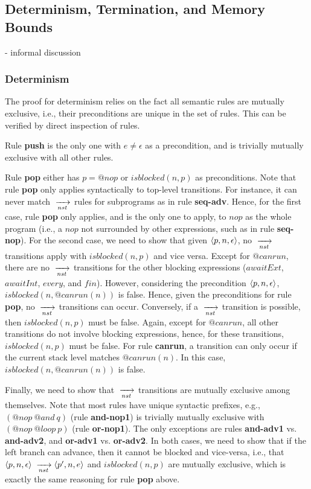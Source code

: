 \subsection{Determinism, Termination, and Memory Bounds}

- informal discussion

\subsubsection*{Determinism}

The proof for determinism relies on the fact all semantic rules are mutually
exclusive, i.e., their preconditions are unique in the set of rules.
This can be verified by direct inspection of rules.

Rule \textbf{push} is the only one with $e \neq \epsilon$ as a precondition,
and is trivially mutually exclusive with all other rules.

Rule \textbf{pop} either has $p=@nop$ or $isblocked(n,p)$ as preconditions.
%
Note that rule \textbf{pop} only applies syntactically to top-level
transitions.
For instance, it can never match $\;\xrightarrow[nst]{\;}$ rules for subprograms as in rule
\textbf{seq-adv}.
%
Hence, for the first case, rule \textbf{pop} only applies, and is the only one
to apply, to $nop$ as the whole program (i.e., a $nop$ not surrounded by other
expressions, such as in rule \textbf{seq-nop}).
%
For the second case, we need to show that given $\langle p,n,\epsilon \rangle$, no
$\;\xrightarrow[nst]{\;}$ transitions apply with $isblocked(n,p)$ and vice versa.
Except for $@canrun$, there are no $\;\xrightarrow[nst]{\;}$ transitions for the other blocking
expressions ($awaitExt$, $awaitInt$, $every$, and $fin$).
However, considering the precondition $\langle p,n,\epsilon \rangle$,
$isblocked(n,@canrun(n))$ is false.
Hence, given the preconditions for rule \textbf{pop}, no $\;\xrightarrow[nst]{\;}$ transitions can
occur.
Conversely, if a $\;\xrightarrow[nst]{\;}$ transition is possible, then $isblocked(n,p)$ must be
false.
Again, except for $@canrun$, all other transitions do not involve blocking
expressions, hence, for these transitions, $isblocked(n,p)$ must be false.
For rule \textbf{canrun}, a transition can only occur if the current stack
level matches $@canrun(n)$.
In this case, $isblocked(n,@canrun(n))$ is false.

Finally, we need to show that $\;\xrightarrow[nst]{\;}$ transitions are mutually exclusive among
themselves.
%
Note that most rules have unique syntactic prefixes, e.g., $(@nop~@and~q)$
(rule \textbf{and-nop1}) is trivially mutually exclusive with $(@nop~@loop~p)$
(rule \textbf{or-nop1}).
%
The only exceptions are rules \textbf{and-adv1} vs. \textbf{and-adv2}, and
\textbf{or-adv1} vs. \textbf{or-adv2}.
In both cases, we need to show that if the left branch can advance, then it
cannot be blocked and vice-versa, i.e., that 
$\langle p,n,\epsilon \rangle \;\xrightarrow[nst]{\;} \langle p',n,e \rangle$ and $isblocked(n,p)$ are mutually
exclusive, which is exactly the same reasoning for rule \textbf{pop} above.


